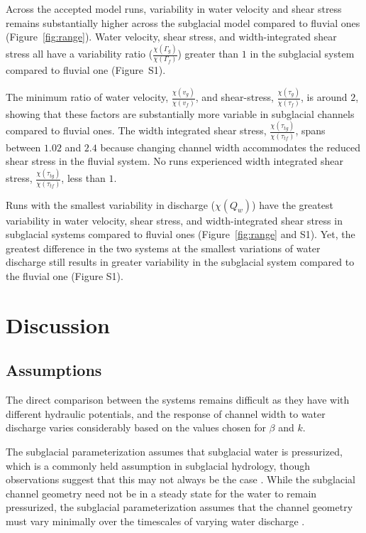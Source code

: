 \documentclass[11pt]{article}
\begin{document}
\begin{spacing}{1}
  Across the accepted model runs, variability in water velocity and shear stress remains substantially higher across the subglacial model compared to fluvial ones (Figure~\ref{fig:range}).
  Water velocity, shear stress, and width-integrated shear stress all have a variability ratio ($\frac{\chi(\Gamma_{g})}{\chi(\Gamma_f)}$) greater than $1$ in the subglacial  system compared to fluvial one (Figure~S1).
  
  The minimum ratio of  water velocity, $\frac{\chi(v_{g})}{\chi(v_{f})}$, and shear-stress, $\frac{\chi(\tau_{g})}{\chi(\tau_{f})}$, is around $2$, showing that these factors are substantially more variable in subglacial channels compared to fluvial ones.
  The width integrated shear stress, $\frac{\chi(\tau_{tg})}{\chi( \tau_{tf})}$, spans between $1.02$ and $2.4$ because changing channel width accommodates the reduced shear stress in the fluvial system.
  No runs experienced width integrated shear stress, $\frac{\chi(\tau_{tg})}{\chi( \tau_{tf})}$, less than $1$.
  
  Runs with the smallest variability in discharge ($\chi(Q_w)$) have the greatest variability in water velocity, shear stress, and width-integrated shear stress in subglacial systems compared to fluvial ones (Figure~\ref{fig:range} and S1).
  Yet, the greatest difference in the two systems at the smallest variations of water discharge still results in greater variability in the subglacial system compared to the fluvial one (Figure S1). 

  
  \section{Discussion}
  \subsection{Assumptions}
  
  The direct comparison between the systems remains difficult as they have with different hydraulic potentials, and the response of channel width to water discharge varies considerably based on the values chosen for $\beta$ and $k$.
  
  The subglacial parameterization assumes that subglacial water is pressurized, which is a commonly held assumption in subglacial hydrology, though observations suggest that this may not always be the case \citep[e.g.][]{gimbert2016}.
  While the subglacial channel geometry need not be in a steady state for the water to remain pressurized, the subglacial parameterization assumes that the channel geometry must vary minimally over the timescales of varying  water discharge \citep[e.g.][]{nanni2020}.
  

\end{spacing}
\end{document}
